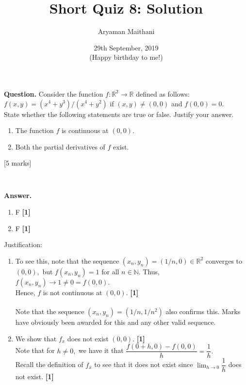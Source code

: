 \documentclass{article}
\title{Short Quiz 8: Solution}      %
\author{Aryaman Maithani}
\date{29th September, 2019 \\ \tiny (Happy birthday to me!)}  		 %
\begin{document}
\maketitle

\hrulefill

\textbf{Question.} Consider the function $f:\mathbb{R}^2 \to \mathbb{R}$ defined as follows: $f(x, y) = (x^4 + y^3)/(x^4 + y^2)$ if $(x, y) \neq (0, 0)$ and $f(0, 0) = 0.$ \\
State whether the following statements are true or false. Justify your answer.
\begin{enumerate}[label = (\alph*)] 
	\item The function $f$ is continuous at $(0,0).$
	\item Both the partial derivatives of $f$ exist.
\end{enumerate}
\hfill [5 marks]
\begin{flushright}
	\\
\end{flushright}

\hrulefill

\textbf{Answer.} 
\begin{enumerate}[label = (\alph*), nosep] 
	\item F \hfill \textbf{[1]}
	\item F \hfill \textbf{[1]}\\
\end{enumerate}

Justification:
\begin{enumerate}[label = (\alph*)] 
	\item To see this, note that the sequence $(x_n, y_n) = (1/n, 0) \in \mathbb{R}^2$ converges to $(0,0),$ but $f(x_n, y_n) = 1$ for all $n \in \mathbb{N}.$ Thus, $f(x_n, y_n) \to 1 \neq 0 = f(0, 0).$\\
	Hence, $f$ is not continuous at $(0, 0).$ \hfill \textbf{[1]}\\~\\
	Note that the sequence $(x_n, y_n) = (1/n, 1/n^2)$ also confirms this. Marks have obviously been awarded for this and any other valid sequence.
	\item We show that $f_x$ does not exist $(0, 0).$ \hfill \textbf{[1]}\\
	Note that for $h \neq 0,$ we have it that $\dfrac{f(0 + h, 0) - f(0, 0)}{h} = \dfrac{1}{h}.$\\
	Recall the definition of $f_x$ to see that it does not exist since $\displaystyle\lim_{h\to 0}\dfrac{1}{h}$ does not exist. \hfill \textbf{[1]}
\end{enumerate}
\hrulefill
\end{document}
